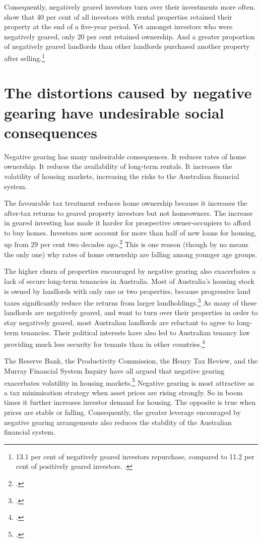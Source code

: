 \documentclass{grattanAlpha}\usepackage[]{graphicx}\usepackage[]{color}
\begin{document}
Consequently, negatively geared investors turn over their investments more often. 
\textcite[][28]{WoodOng2010} show that 40 per cent of all investors with rental properties retained their property at the end of a five-year period.  
Yet amongst investors who were negatively geared, only 20 per cent retained ownership. And a greater proportion of negatively geared landlords than other landlords purchased another property after selling.\footnote{13.1 per cent of negatively geared investors repurchase, compared to 11.2 per cent of positively geared investors. \textcite[][28]{WoodOng2010}.}  

\section{The distortions caused by negative gearing have undesirable social consequences}
Negative gearing has many undesirable consequences. It reduces rates of home ownership. 
It reduces the availability of long-term rentals. It increases the volatility of housing markets, increasing the risks to the Australian financial system. 

The favourable tax treatment reduces home ownership because it increases the after-tax returns to geared property investors but not homeowners. 
The increase in geared investing has made it harder for prospective owner-occupiers to afford to buy homes. 
Investors now account for more than half of new loans for housing, up from 29 per cent two decades ago.\footcite[][Table~8]{ABS2016a}  
This is one reason (though by no means the only one) why rates of home ownership are falling among younger age groups. 

The higher churn of properties encouraged by negative gearing also exacerbates a lack of secure long-term tenancies in Australia. 
Most of Australia’s housing stock is owned by landlords with only one or two properties, because progressive land taxes significantly reduce the returns from larger landholdings.\footcite[][15]{DaleyCoates2015PropertyTaxes}  
As many of these landlords are negatively geared, and want to turn over their properties in order to stay negatively geared, most Australian landlords are reluctant to agree to long-term tenancies. 
Their political interests have also led to Australian tenancy law providing much less security for tenants than in other countries.\footcite[][19--21]{KellyMaresHarrisonEtAl2013} 

The Reserve Bank, the Productivity Commission, the Henry Tax Review, and the Murray Financial System Inquiry have all argued that negative gearing exacerbates volatility in housing markets.\footcites[][88]{RBA2014FinancialSystemInquirySubmission}[][45]{RBA2014SubmissionAffordableHousingInquiry}[][75 and 131]{ProductivityCommission2004FirstHomeOwnership}[][70 and 418]{HenryTaxReview2010}[][278]{FinancialSystemsInquiry2015}
Negative gearing is most attractive as a tax minimisation strategy when asset prices are rising strongly. 
So in boom times it further increases investor demand for housing. 
The opposite is true when prices are stable or falling. 
Consequently, the greater leverage encouraged by negative gearing arrangements also reduces the stability of the Australian financial system.
\end{document}
